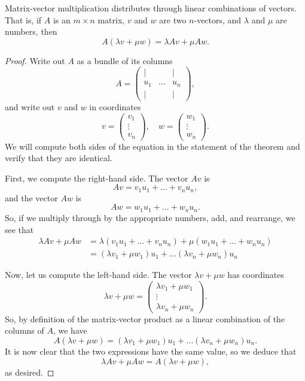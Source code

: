 \documentclass[00-livre-main.tex]{subfiles}
\begin{document}
\begin{theorem} 
Matrix-vector multiplication distributes through linear combinations of vectors. That is, if $A$ is an $m\times n$ matrix, $v$ and $w$ are two $n$-vectors, and $\lambda$ and $\mu$ are numbers, then
\[
A(\lambda v + \mu w) = \lambda  Av + \mu Aw .
\]
\end{theorem}

\begin{proof}
Write out $A$ as a bundle of its columns
\[
A = \begin{pmatrix} | &   & | \\ u_1 &  \dots & u_n \\ | &  & | \end{pmatrix},
\]
and write out $v$ and $w$ in coordinates
\[
v = \begin{pmatrix} v_1 \\ \vdots \\ v_n \end{pmatrix}, \quad
w = \begin{pmatrix} w_1 \\ \vdots \\ w_n \end{pmatrix}.
\]
We will compute both sides of the equation in the statement of the theorem and verify that they are identical.

First, we compute the right-hand side. The vector $Av$ is
\[
Av = v_1 u_1 + \dots + v_n u_n,
\]
and the vector $Aw$ is
\[
Aw = w_1 u_1 + \dots + w_n u_n.
\]
So, if we multiply through by the appropriate numbers, add, and rearrange, we see that
\[
\begin{split}
\lambda Av + \mu Aw & = \lambda \left( v_1 u_1 + \dots + v_n u_n \right) 
  + \mu \left( w_1 u_1 + \dots + w_n u_n \right) \\
& = (\lambda v_1 + \mu w_1) u_1 + \dots (\lambda v_n + \mu w_n) u_n
\end{split}
\]

Now, let us compute the left-hand side. The vector $\lambda v + \mu w$ has coordinates
\[
\lambda v + \mu w = \begin{pmatrix} \lambda v_1 + \mu w_1 \\ \vdots \\ \lambda v_n + \mu w_n \end{pmatrix}.
\]
So, by definition of the matrix-vector product as a linear combination of the columns of $A$, we have
\[
A ( \lambda v + \mu w) = (\lambda v_1 + \mu w_1) u_1 + \dots (\lambda v_n + \mu w_n) u_n.
\]
It is now clear that the two expressions have the same value, so we deduce that 
\[
\lambda Av + \mu Aw = A ( \lambda v + \mu w), 
\]
as desired.
\end{proof}
\end{document}
